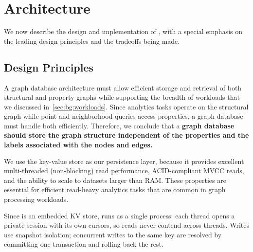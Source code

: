 \chapter{\project{} Architecture}
\label{sec:architecture}

We now describe the design and implementation of \project{}, with a special emphasis on the leading design principles and the tradeoffs being made.

\section{Design Principles}
\label{arch:design-principles}


A graph database architecture must allow efficient storage and retrieval of both structural and property graphs while supporting the breadth of workloads that we discussed in~\autoref{sec:bg:workloads}.
Since \mbox{analytics} tasks operate on the structural graph while point and neighborhood queries access properties, a graph database must handle both efficiently.
Therefore, we conclude that a \textbf{graph database should store the graph structure independent of the properties and the labels associated with the nodes and edges.}

We use the \wt{} key-value store as our persistence layer, because it provides %
excellent multi-threaded (non-blocking) read performance, ACID-compliant MVCC reads, and the ability to scale to datasets larger than RAM.
These properties are essential for efficient read-heavy analytics tasks that are common in graph processing workloads. 

Since \wt{} is an embedded KV store, \project{} runs as a single process: each thread opens a private session with its own cursors, so reads never contend across threads.
Writes use snapshot isolation; concurrent writes to the same key are resolved by committing one transaction and rolling back the rest.

